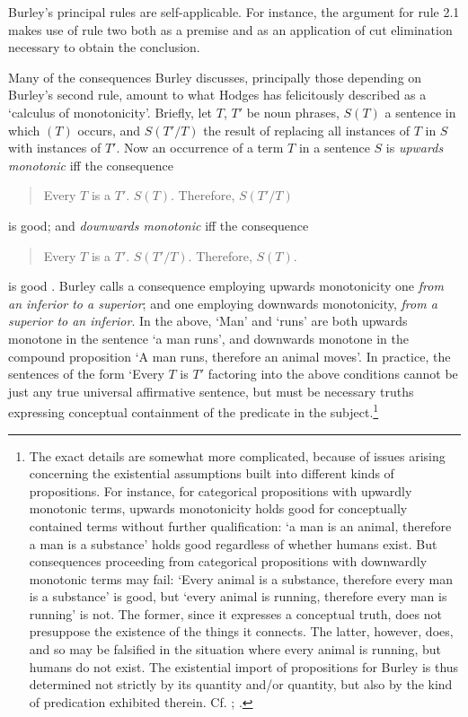 \documentclass[]{article}
\begin{document}
Burley's principal rules are self-applicable. For instance, the argument for rule 2.1 makes use of rule two both as a premise and as an application of cut elimination necessary to obtain the conclusion. 

Many of the consequences Burley discusses, principally those depending on Burley's second rule, amount to what Hodges has felicitously described as a `calculus of monotonicity'. Briefly, let $T$, $T'$ be noun phrases, $S(T)$ a sentence in which $(T)$ occurs, and $S(T'/T)$ the result of replacing all instances of $T$ in $S$ with instances of $T'$. Now an occurrence of a term $T$ in a sentence $S$ is \textit{upwards monotonic} iff the consequence
\begin{quote}
	Every $T$ is a $T'$. $S(T)$. Therefore, $S(T'/T)$
\end{quote}
is good; and \textit{downwards monotonic} iff the consequence 
\begin{quote}
	Every $T$ is a $T'$. $S(T'/T)$. Therefore, $S(T)$.
\end{quote}
is good \cite[pp. 27-28]{HodgesBurley}. Burley calls a consequence employing upwards monotonicity one \textit{from an inferior to a superior}; and one employing downwards monotonicity, \textit{from a superior to an inferior}. In the above, `Man' and `runs' are both upwards monotone in the sentence `a man runs', and downwards monotone in the compound proposition `A man runs, therefore an animal moves'. In practice, the sentences of the form `Every $T$ is $T'$ factoring into the above conditions cannot be just any true universal affirmative sentence, but must be necessary truths expressing conceptual containment of the predicate in the subject.\footnote{The exact details are somewhat more complicated, because of issues arising concerning the existential assumptions built into different kinds of propositions. For instance, for categorical propositions with upwardly monotonic terms, upwards monotonicity holds good for conceptually contained terms without further qualification: `a man is an animal, therefore a man is a substance' holds good regardless of whether humans exist. But consequences proceeding from categorical propositions with downwardly monotonic terms may fail: `Every animal is a substance, therefore every man is a substance' is good, but `every animal is running, therefore every man is running' is not. The former, since it expresses a conceptual truth, does not presuppose the existence of the things it connects. The latter, however, does, and so may be falsified in the situation where every animal is running, but humans do not exist. The existential import of propositions for Burley is thus determined not strictly by its quantity and/or quantity, but also by the kind of predication exhibited therein. Cf. \cite[pp. 61.4-5; 85.3-5, 25-26; 216.15-18]{BurleyDPAL}; \cite[p. 32]{HodgesBurley}.} 
\end{document}
